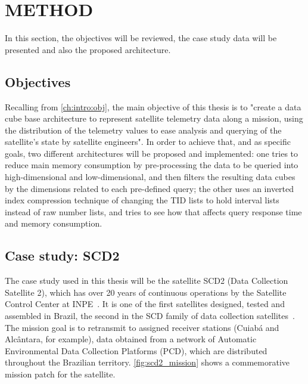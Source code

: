 
\chapter{METHOD}\label{ch:prop}

In this section, the objectives will be reviewed, the case study data will be presented and also the proposed architecture.

\section{Objectives}\label{ch:prop:obj}

Recalling from \autoref{ch:intro:obj}, the main objective of this thesis is to "create a data cube base architecture to represent satellite telemetry data along a mission, using the distribution of the telemetry values to ease analysis and querying of the satellite's state by satellite engineers".
In order to achieve that, and as specific goals, two different architectures will be proposed and implemented: one tries to reduce main memory consumption by pre-processing the data to be queried into high-dimensional and low-dimensional, and then filters the resulting data cubes by the dimensions related to each pre-defined query; the other uses an inverted index compression technique of changing the TID lists to hold interval lists instead of raw number lists, and tries to see how that affects query response time and memory consumption.

\section{Case study: SCD2}\label{ch:prop:scd2}

The case study used in this thesis will be the satellite SCD2 (Data Collection Satellite 2), which has over 20 years of continuous operations by the Satellite Control Center at INPE~\cite{OrlandoKuga:2007:SaSCSC}.
It is one of the first satellites designed, tested and assembled in Brazil, the second in the SCD family of data collection satellites~\cite{Oliveira:1996:SC1Sa}.
The mission goal is to retransmit to assigned receiver stations (Cuiabá and Alcântara, for example), data obtained from a network of Automatic Environmental Data Collection Platforms (PCD), which are distributed throughout the Brazilian territory.
\autoref{fig:scd2_mission} shows a commemorative mission patch for the satellite.

